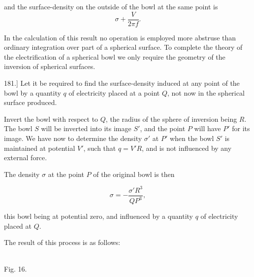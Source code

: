 \documentclass[11pt,a4paper]{article}
\begin{document}
and the surface-density on the outside of the bowl at the same point is
\[
\sigma+\frac{V}{2\pi f}.
\]

In the calculation of this result no operation is employed more abstruse than ordinary integration over part of a spherical surface. To complete the theory of the electrification of a spherical bowl we only require the geometry of the inversion of spherical surfaces.

181.] Let it be required to find the surface-density induced at any point of the bowl by a quantity $q$ of electricity placed at a point $Q$, not now in the spherical surface produced.

Invert the bowl with respect to $Q$, the radius of the sphere of inversion being $R$. The bowl $S$ will be inverted into its image $S'$, and the point $P$ will have $P'$ for its image. We have now to determine the density $\sigma'$ at $P'$ when the bowl $S'$ is maintained at potential $V'$, such that $q=V'R$, and is not influenced by any external force.

The density $\sigma$ at the point $P$ of the original bowl is then

\[
\sigma = -\frac{\sigma'R^3}{QP^3},
\]

this bowl being at potential zero, and influenced by a quantity $q$ of electricity placed at $Q$.

The result of this process is as follows:

\begin{center}
\\
{\small Fig. 16.}
\end{center}
\end{document}
